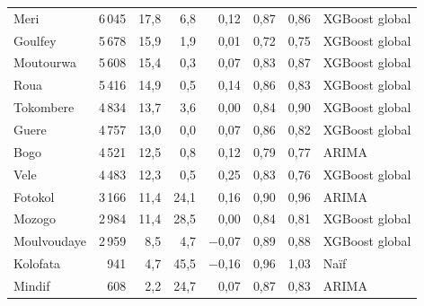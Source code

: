 \begin{table}[!htbp]
{\begin{tabular}{@{}lrrrrrrl@{}}
Meri & 6\,045 & 17,8 & 6,8 & 0,12 & 0,87 & 0,86 & XGBoost global \\
Goulfey & 5\,678 & 15,9 & 1,9 & 0,01 & 0,72 & 0,75 & XGBoost global \\
Moutourwa & 5\,608 & 15,4 & 0,3 & 0,07 & 0,83 & 0,87 & XGBoost global \\
Roua & 5\,416 & 14,9 & 0,5 & 0,14 & 0,86 & 0,83 & XGBoost global \\
Tokombere & 4\,834 & 13,7 & 3,6 & 0,00 & 0,84 & 0,90 & XGBoost global \\
Guere & 4\,757 & 13,0 & 0,0 & 0,07 & 0,86 & 0,82 & XGBoost global \\
Bogo & 4\,521 & 12,5 & 0,8 & 0,12 & 0,79 & 0,77 & ARIMA \\
Vele & 4\,483 & 12,3 & 0,5 & 0,25 & 0,83 & 0,76 & XGBoost global \\
Fotokol & 3\,166 & 11,4 & 24,1 & 0,16 & 0,90 & 0,96 & ARIMA \\
Mozogo & 2\,984 & 11,4 & 28,5 & 0,00 & 0,84 & 0,81 & XGBoost global \\
Moulvoudaye & 2\,959 & 8,5 & 4,7 & $-$0,07 & 0,89 & 0,88 & XGBoost global \\
Kolofata & 941 & 4,7 & 45,5 & $-$0,16 & 0,96 & 1,03 & Naïf \\
Mindif & 608 & 2,2 & 24,7 & 0,07 & 0,87 & 0,83 & ARIMA \\
\bottomrule\end{tabular}}
\end{table}

